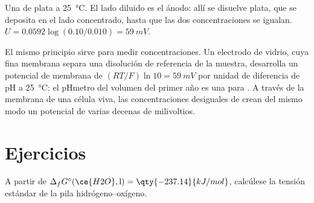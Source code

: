\begin{omfigure}

{\small Una  de plata a \qty{25}{\degreeCelsius}. El lado diluido es
el ánodo: allí se disuelve plata, que se deposita en el lado concentrado,
hasta que las dos concentraciones se igualan. $U = 0.0592\log(0.10/0.010) =
\qty{59}{mV}$.}
\end{omfigure}

El mismo principio sirve para medir concentraciones. Un electrodo de vidrio, cuya fina
membrana separa una disolución de referencia de la muestra, desarrolla un potencial de membrana
de $(RT/F)\ln 10 = \qty{59}{mV}$ por unidad de diferencia de pH a
\qty{25}{\degreeCelsius}: el pHmetro del volumen del primer año es una 
para . A través de la membrana de una célula viva, las concentraciones desiguales
de  crean del mismo modo un potencial de varias decenas de milivoltios.

\section{Ejercicios}

\begin{exercise}[$\star$]\label{exo:b2:cell-thermodynamics:1}
A partir de $\Delta_f G^\circ(\ce{H2O}, \text{l}) = \qty{-237.14}{kJ/mol}$, calcúlese la
tensión estándar de la pila hidrógeno--oxígeno.
\end{exercise}

